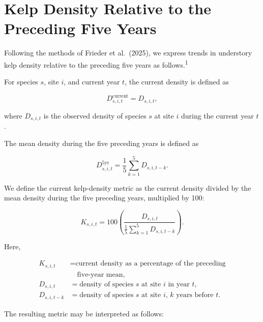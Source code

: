 \documentclass[11pt]{article}
\begin{document}
	
	\raggedright
	\setlength{\parindent}{0pt}
	
	\section*{Kelp Density Relative to the Preceding Five Years}
	
Following the methods of Frieder et al.\ (2025), we express trends in
understory kelp density relative to the preceding five years as
follows.\textsuperscript{1}


    \vspace{5mm} 
	For species \(s\), site \(i\), and current year \(t\), the current
	density is defined as
	
	\begin{equation}
		D_{s,i,t}^{\mathrm{current}}
		=
		D_{s,i,t},
	\end{equation}
	
	where \(D_{s,i,t}\) is the observed density of species \(s\) at site
	\(i\) during the current year \(t\).
	
	The mean density during the five preceding years is defined as
	
	\begin{equation}
		D_{s,i,t}^{\mathrm{5yr}}
		=
		\frac{1}{5}
		\sum_{k=1}^{5}
		D_{s,i,t-k}.
	\end{equation}
	
	We define the current kelp-density metric as the current density
	divided by the mean density during the five preceding years,
	multiplied by 100:
	
	\begin{equation}
		K_{s,i,t}
		=
		100
		\left(
		\frac{D_{s,i,t}}
		{\displaystyle \frac{1}{5}
			\sum_{k=1}^{5} D_{s,i,t-k}}
		\right).
	\end{equation}
	
	Here,
	
	\begin{align*}
		K_{s,i,t}
		&= \text{current density as a percentage of the preceding}\\
		&\quad \text{five-year mean},\\
		D_{s,i,t}
		&= \text{density of species \(s\) at site \(i\) in year \(t\)},\\
		D_{s,i,t-k}
		&= \text{density of species \(s\) at site \(i\), \(k\) years before 
		\(t\)}.
	\end{align*}
	
	The resulting metric may be interpreted as follows:
	
\end{document}
